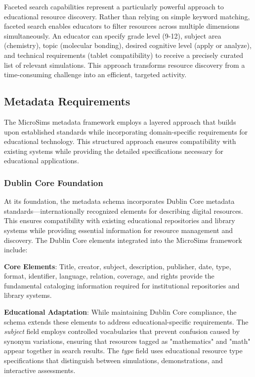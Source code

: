 Faceted search capabilities represent a particularly powerful approach to educational resource discovery. Rather than relying on simple keyword matching, faceted search enables educators to filter resources across multiple dimensions simultaneously. An educator can specify grade level (9-12), subject area (chemistry), topic (molecular bonding), desired cognitive level (apply or analyze), and technical requirements (tablet compatibility) to receive a precisely curated list of relevant simulations. This approach transforms resource discovery from a time-consuming challenge into an efficient, targeted activity.

\subsection{Metadata Requirements}

The MicroSims metadata framework employs a layered approach that builds upon established standards while incorporating domain-specific requirements for educational technology. This structured approach ensures compatibility with existing systems while providing the detailed specifications necessary for educational applications.

\subsubsection{Dublin Core Foundation}

At its foundation, the metadata schema incorporates Dublin Core metadata standards---internationally recognized elements for describing digital resources. This ensures compatibility with existing educational repositories and library systems while providing essential information for resource management and discovery. The Dublin Core elements integrated into the MicroSims framework include:

\textbf{Core Elements}: Title, creator, subject, description, publisher, date, type, format, identifier, language, relation, coverage, and rights provide the fundamental cataloging information required for institutional repositories and library systems.

\textbf{Educational Adaptation}: While maintaining Dublin Core compliance, the schema extends these elements to address educational-specific requirements. The \textit{subject} field employs controlled vocabularies that prevent confusion caused by synonym variations, ensuring that resources tagged as "mathematics" and "math" appear together in search results. The \textit{type} field uses educational resource type specifications that distinguish between simulations, demonstrations, and interactive assessments.

